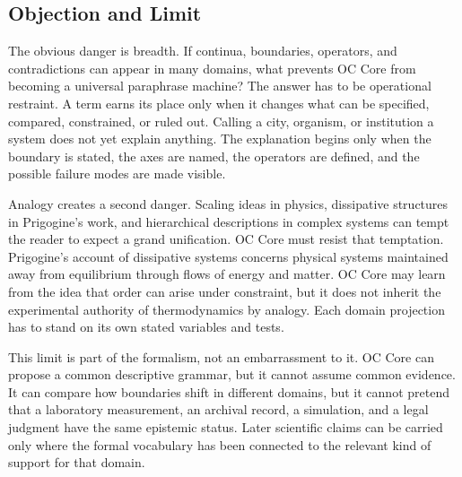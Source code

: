 \documentclass[11pt,a4paper,openany]{book}
\begin{document}
\subsection{Objection and Limit}
The obvious danger is breadth. If continua, boundaries, operators, and contradictions can appear in many domains, what prevents OC Core from becoming a universal paraphrase machine? The answer has to be operational restraint. A term earns its place only when it changes what can be specified, compared, constrained, or ruled out. Calling a city, organism, or institution a system does not yet explain anything. The explanation begins only when the boundary is stated, the axes are named, the operators are defined, and the possible failure modes are made visible. \cite{kadanoff_scaling,wilson_renormalization}\par
Analogy creates a second danger. Scaling ideas in physics, dissipative structures in Prigogine's work, and hierarchical descriptions in complex systems can tempt the reader to expect a grand unification. OC Core must resist that temptation. Prigogine's account of dissipative systems concerns physical systems maintained away from equilibrium through flows of energy and matter. OC Core may learn from the idea that order can arise under constraint, but it does not inherit the experimental authority of thermodynamics by analogy. Each domain projection has to stand on its own stated variables and tests.\par
This limit is part of the formalism, not an embarrassment to it. OC Core can propose a common descriptive grammar, but it cannot assume common evidence. It can compare how boundaries shift in different domains, but it cannot pretend that a laboratory measurement, an archival record, a simulation, and a legal judgment have the same epistemic status. Later scientific claims can be carried only where the formal vocabulary has been connected to the relevant kind of support for that domain.\par
\end{document}
